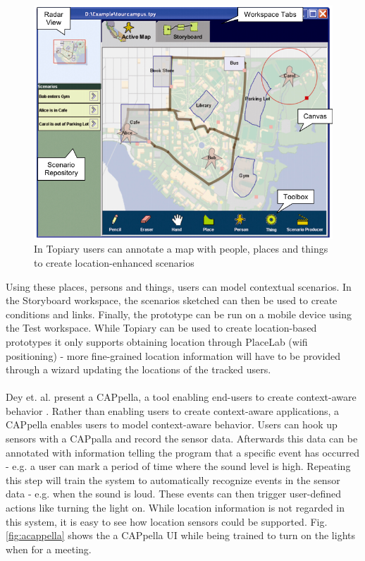 \begin{figure}
	\centering
	\includegraphics[scale=0.4]{fig/topiary}
	\caption{In Topiary \cite{Li:2004:TTP:1029632.1029671} users can annotate a map with people, places and things to create location-enhanced scenarios}
	\label{fig:topiary}
\end{figure}

\noindent Using these places, persons and things, users can model contextual scenarios. In the Storyboard workspace, the scenarios sketched can then be used to create conditions and links. Finally, the prototype can be run on a mobile device using the Test workspace. While Topiary can be used to create location-based prototypes it only supports obtaining location through PlaceLab (wifi positioning) - more fine-grained location information will have to be provided through a wizard updating the locations of the tracked users. 
\\\\
Dey et. al. present a CAPpella, a tool enabling end-users to create context-aware behavior \cite{Dey:2004:CPD:985692.985697}. Rather than enabling users to create context-aware applications, a CAPpella enables users to model context-aware behavior. Users can hook up sensors with a CAPpalla and record the sensor data. Afterwards this data can be annotated with information telling the program that a specific event has occurred - e.g. a user can mark a period of time where the sound level is high. Repeating this step will train the system to automatically recognize events in the sensor data - e.g. when the sound is loud. These events can then trigger user-defined actions like turning the light on. While location information is not regarded in this system, it is easy to see how location sensors could be supported. Fig. \ref{fig:acappella} shows the a CAPpella UI while being trained to turn on the lights when for a meeting.
\\

